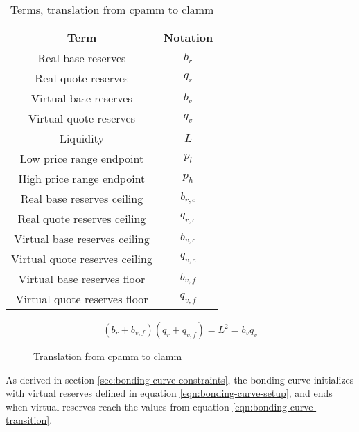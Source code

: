 \documentclass[table, twocolumn]{article}
\begin{document}
\begin{table}[!htb]
  \centering
  \begin{tabular}{|c|c|}
    \hline \rowcolor{blue}
    Term                           & Notation  \\ \hline
    Real base reserves             & $b_r$     \\ \hline
    Real quote reserves            & $q_r$     \\ \hline
    Virtual base reserves          & $b_v$     \\ \hline
    Virtual quote reserves         & $q_v$     \\ \hline
    Liquidity                      & $L$       \\ \hline
    Low price range endpoint       & $p_l$     \\ \hline
    High price range endpoint      & $p_h$     \\ \hline
    Real base reserves ceiling     & $b_{r,c}$ \\ \hline
    Real quote reserves ceiling    & $q_{r,c}$ \\ \hline
    Virtual base reserves ceiling  & $b_{v,c}$ \\ \hline
    Virtual quote reserves ceiling & $q_{v,c}$ \\ \hline
    Virtual base reserves floor    & $b_{v,f}$ \\ \hline
    Virtual quote reserves floor   & $q_{v,f}$ \\ \hline
  \end{tabular}
  \caption{Terms, translation from \gls{cpamm} to \gls{clamm}}
  \label{tab:clamm-curve-translation}
\end{table}

\begin{equation} \label{eqn:clamm-curve-translation}
  (b_r + b_{v, f})(q_r + q_{v, f}) = L^2 = b_v q_v
\end{equation}

\begin{figure}[!htb]
  \centering
  
  \caption{Translation from \gls{cpamm} to \gls{clamm}}
  \label{fig:clamm-curve-translation}
\end{figure}

As derived in section \ref{sec:bonding-curve-constraints}, the bonding curve initializes
with virtual reserves defined in equation \ref{eqn:bonding-curve-setup}, and ends when
virtual reserves reach the values from equation \ref{eqn:bonding-curve-transition}.
\end{document}

